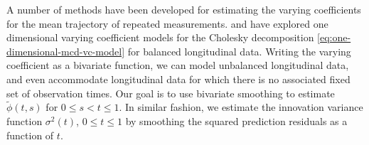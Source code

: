 A number of methods have been developed for estimating the varying coefficients for the mean trajectory of repeated measurements. \cite{wu2003nonparametric} and \cite{dahlhaus1997fitting} have explored one dimensional varying coefficient models for the Cholesky decomposition \eqref{eq:one-dimensional-mcd-vc-model} for balanced longitudinal data. Writing the varying coefficient as a bivariate function, we can model unbalanced longitudinal data, and even accommodate longitudinal data for which there is no associated fixed set of observation times. Our goal is to use bivariate smoothing to estimate $\tilde{\phi}\left(t,s\right)$ for $0 \le s < t \le 1$. In similar fashion, we estimate the innovation variance function $\sigma^2\left(t \right)$, $0 \le t \le 1$ by smoothing the squared prediction residuals as a function of $t$. 

\bigskip

